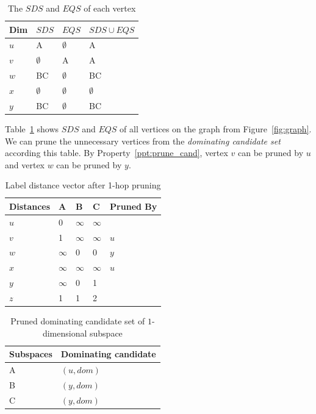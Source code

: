 \begin{table}[h]
    \centering
    \begin{tabular}{|l|l|l|l|}
    \hline
    Dim & $SDS$       & $EQS$       & $SDS \cup EQS$ \\ \hline
    $u$ & A           & $\emptyset$ & A              \\ \hline
    $v$ & $\emptyset$ & A           & A              \\ \hline
    $w$ & BC          & $\emptyset$ & BC             \\ \hline
    $x$ & $\emptyset$ & $\emptyset$ & $\emptyset$    \\ \hline
    $y$ & BC          & $\emptyset$ & BC             \\ \hline
    \end{tabular}
    \caption{The $SDS$ and $EQS$ of each vertex}
    \label{tab:SDS_EQS}
\end{table}

Table~\ref{tab:SDS_EQS} shows $SDS$ and $EQS$ of all vertices on the graph from Figure~\ref{fig:graph}. We can prune the unnecessary vertices from the \emph{dominating candidate set} according this table. By Property~\ref{ppt:prune_cand}, vertex $v$ can be pruned by $u$ and vertex $w$ can be pruned by $y$.

\begin{table}[h]
    \centering
    \begin{tabular}{lllll}
    \hline
    Distances & A & B & C & Pruned By\\ \hline
    $u$       & 0 & $\infty$ & $\infty$ &\\ \hline
    $v$       & 1 & $\infty$ & $\infty$ & $u$\\ \hline
    $w$       & $\infty$ & 0 & 0 & $y$\\ \hline
    $x$       & $\infty$ & $\infty$ & $\infty$ & $u$\\ \hline
    $y$       & $\infty$ & 0 & 1 & \\ \hline
    $z$       & 1 & 1 & 2 &\\ \hline
    \end{tabular}
    \caption{Label distance vector after 1-hop pruning}
    \label{tab:lv_pruned}
\end{table}

\begin{table}[h]
    \centering
    \begin{tabular}{|l|l|}
    \hline
    Subspaces & Dominating candidate \\ \hline
    A         & $(u, dom)$            \\ \hline
    B         & $(y, dom)$            \\ \hline
    C         & $(y, dom)$            \\ \hline
    \end{tabular}
    \caption{Pruned dominating candidate set of $1$-dimensional subspace}
    \label{tab:dom_cand_pruned}
\end{table}

